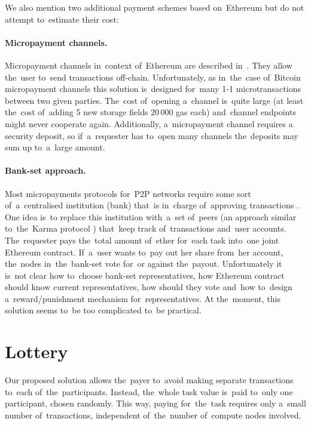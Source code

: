 \documentclass[a4paper]{article}
\begin{document}
    We also mention two additional payment schemes based on~Ethereum but do not attempt to~estimate their cost:
    
    \paragraph{Micropayment channels.}
    Micropayment channels in~context of~Ethereum are described in~\cite{BUTERIN}. They allow the~user to~send
    transactions off-chain. Unfortunately, as in~the~case of~Bitcoin micropayment channels \cite{BITCOINJ} this
    solution is~designed for~many 1-1 microtransactions between two given parties. The~cost of~opening a~channel
    is~quite large (at least the~cost of~adding 5 new storage fields $20\,000$ gas each) and~channel endpoints might
    never cooperate again. Additionally, a~micropayment channel requires a security deposit, so if~a~requester has to~open
    many channels the~deposits may sum up to~a~large amount.

    \paragraph{Bank-set approach.}
    Most micropayments protocols for~P2P networks require some sort of~a~centralised institution (bank) that~is
    in~charge of~approving transactions \cite{JAIN}. One idea is~to replace this institution with~a~set of~peers
    (an approach similar to~the~Karma protocol \cite{VISHNUMURTHY}) that~keep track of~transactions and~user accounts.
    The~requester pays the~total amount of~ether for~each task into~one joint Ethereum contract.
    If~a~user wants to~pay out her share from~her account, the~nodes in~the~bank-set vote for~or against the~payout.
    Unfortunately it is~not clear how to~choose bank-set representatives, how Ethereum contract should know
    current representatives, how should they vote and~how to~design a~reward/punishment mechanism
    for~representatives. At the~moment, this solution seems to~be too complicated to~be practical.

\section{Lottery}
\label{sec:lottery}

    Our proposed solution allows the~payer to~avoid making separate transactions to~each of~the~participants. Instead,
    the~whole task value is~paid to~only one participant, chosen randomly. This way, paying for~the~task requires only
    a~small number of~transactions, independent of~the~number of~compute nodes involved.
\end{document}
